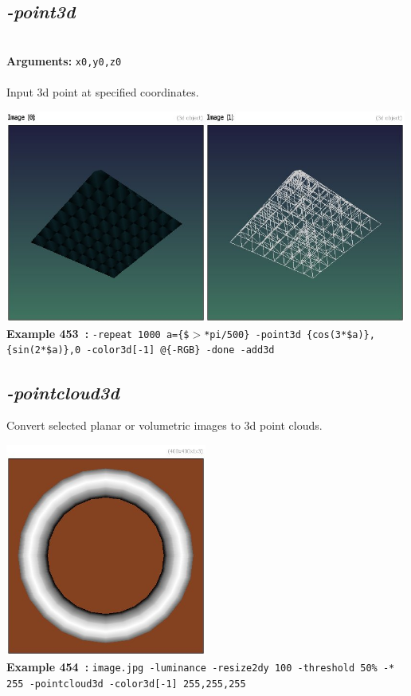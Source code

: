 \documentclass[a4paper,11pt,twoside]{book}
\begin{document}
\subsection{\emph{-point3d} }\vspace*{-0.5em}
~\\\textbf{Arguments: } 
{\small \texttt{x0,y0,z0}}\\~\\
Input 3d point at specified coordinates.
\begin{center}\includegraphics[keepaspectratio=true,height=7cm,width=\textwidth]{img/gmic_def453.jpg}\\
{\footnotesize \textbf{Example 453~:} \texttt{-repeat 1000 a=\{\$$>$*pi/500\} -point3d \{cos(3*\$a)\},\{sin(2*\$a)\},0 -color3d[-1] @\{-RGB\} -done -add3d}}
\end{center}

\subsection{\emph{-pointcloud3d} }\vspace*{-0.5em}
Convert selected planar or volumetric images to 3d point clouds.
\begin{center}\includegraphics[keepaspectratio=true,height=7cm,width=\textwidth]{img/gmic_def454.jpg}\\
{\footnotesize \textbf{Example 454~:} \texttt{image.jpg -luminance -resize2dy 100 -threshold 50\% -* 255 -pointcloud3d -color3d[-1] 255,255,255}}
\end{center}
\end{document}
